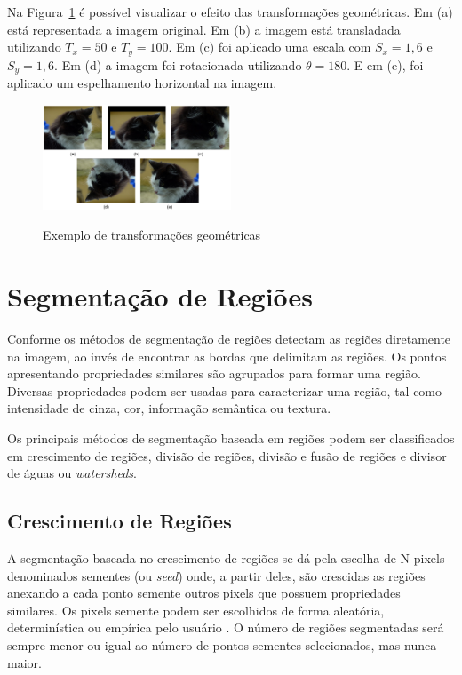 \documentclass[12pt,oneside,a4paper,english,french,spanish,brazil,]{abntex2}
\begin{document}
Na Figura~\ref{fig:PDI_Transformacoes_Geometricas} é possível visualizar o efeito das transformações geométricas. Em (a) está representada a imagem original. Em (b) a imagem está transladada utilizando \(T_x=50\) e \(T_y=100\). Em (c) foi aplicado uma escala com \(S_x=1,6\) e \(S_y=1,6\). Em (d) a imagem foi rotacionada utilizando \(\theta=180\). E em (e), foi aplicado um espelhamento horizontal na imagem.

\begin{figure}[ht]
\centering
\caption{Exemplo de transformações geométricas}
\includegraphics[width=0.5\textwidth]{imagens/PDI_Transformacoes_Geometricas.pdf}
\sourceAuthor
\label{fig:PDI_Transformacoes_Geometricas}
\end{figure}

\section{Segmentação de Regiões}
Conforme \cite{pedrini:2008} os métodos de segmentação de regiões detectam as regiões diretamente na imagem, ao invés de encontrar as bordas que delimitam as regiões. Os pontos apresentando propriedades similares são agrupados para formar uma região. Diversas propriedades podem ser usadas para caracterizar uma região, tal como intensidade de cinza, cor, informação semântica ou textura.

Os principais métodos de segmentação baseada em regiões podem ser classificados em crescimento de regiões, divisão de regiões, divisão e fusão de regiões e divisor de águas ou \textit{watersheds}.

\subsection{Crescimento de Regiões}

A segmentação baseada no crescimento de regiões se dá pela escolha de N pixels denominados sementes (ou \textit{seed}) onde, a partir deles, são crescidas as regiões anexando a cada ponto semente outros pixels que possuem propriedades similares. Os pixels semente podem ser escolhidos de forma aleatória, determinística ou empírica pelo usuário \cite{pedrini:2008}. O número de regiões segmentadas será sempre menor ou igual ao número de pontos sementes selecionados, mas nunca maior.
\end{document}

